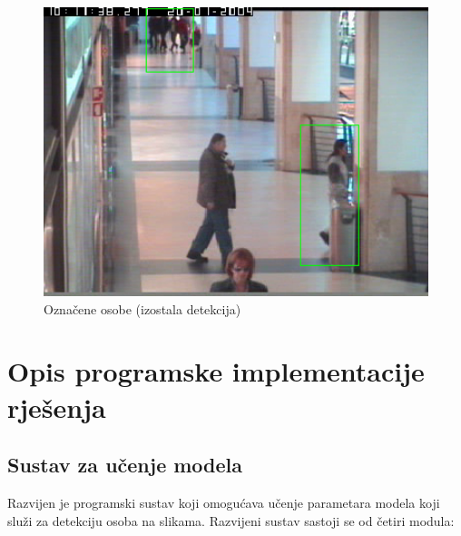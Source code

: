\documentclass[utf8, seminar, numeric, times]{fer}
\begin{document}
\begin{figure}
\centering
\includegraphics[width=1\textwidth]{otok_detekt.png}
\caption{Označene osobe (izostala detekcija)}
\label{lazna_detekt}
\end{figure}


\chapter{Opis programske implementacije rješenja}

\section{Sustav za učenje modela}

Razvijen je programski sustav koji omogućava učenje parametara modela koji služi za detekciju osoba na slikama. Razvijeni sustav sastoji se od četiri modula:
\end{document}
